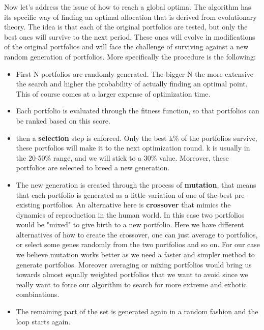 
Now let's address the issue of how to reach a global optima. The algorithm has its specific way of finding an optimal allocation that is derived from evolutionary theory. The idea is that each of the original portfolios are tested, but only the best ones will survive to the next period. These ones will evolve in modifications of the original portfolios and will face the challenge of surviving against a new random generation of portfolios. More specifically the procedure is the following:

\begin{itemize}
	\item First N portfolios are randomly generated. The bigger N the more extensive the search and higher the probability of actually finding an optimal point. This of course comes at a larger expense of optimization time.
	\item Each portfolio is evaluated through the fitness function, so that portfolios can be ranked based on this score.
	\item then a \textbf{selection} step is enforced. Only the best k\% of the portfolios survive, these portfolios will make it to the next optimization round. k is usually in the 20-50\% range, and we will stick to a 30\% value. Moreover, these portfolios are selected to breed a new generation.
	\item The new generation is created through the process of \textbf{mutation}, that means that each portfolio is generated as a little variation of one of the best pre-existing portfolios. An alternative here is \textbf{crossover} that mimics the dynamics of reproduction in the human world. In this case two portfolios would be "mixed" to give birth to a new portfolio. Here we have different alternatives of how to create the crossover, one can just average to portfolios, or select some genes randomly from the two portfolios and so on. For our case we believe mutation works better as we need a faster and simpler method to generate portfolios. Moreover averaging or mixing portfolios would bring us towards almost equally weighted portfolios that we want to avoid since we really want to force our algorithm to search for more extreme and exhotic combinations. 
	\item The remaining part of the set is generated again in a random fashion and the loop starts again.
\end{itemize}

